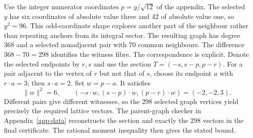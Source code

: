 Use the integer numerator coordinates $p=y/\sqrt{12}$ of the appendix.
The selected $y$ has six coordinates of absolute value three and 42 of
absolute value one, so $y^2=96$. This odd-coordinate shape explores
another part of the neighbour rather than repeating anchors from its
integral sector. The resulting graph has degree 368 and a selected
nonadjacent pair with 70 common neighbours.
The difference \(368-70=298\) identifies the witness
fibre. The correspondence is explicit. Denote the selected endpoints by
$r,s$ and use the section $T=(-s,s-p,p-r)$. For a pair adjacent to the
vertex of $r$ but not that of $s$, choose its endpoint $a$ with
$r\cdot a=3$; then $s\cdot a=2$. Set $w=p-a$. It satisfies
\[
\|w\|^2=6,\qquad (-s\cdot w,(s-p)\cdot w,(p-r)\cdot w)=(-2,-2,3).
\]
Different pairs give different witnesses, so the 298 selected graph
vertices yield precisely the required lattice vectors. The
parent-graph checker in Appendix~\ref{app:data} reconstructs the section and exactly the 298 vectors in the
final certificate. The rational moment inequality then gives the stated
bound.
